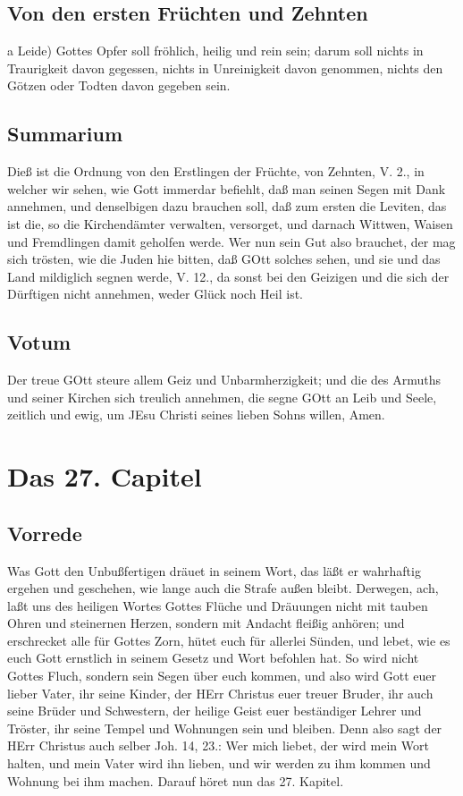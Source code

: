 \section{Von den ersten Früchten und Zehnten}

a Leide) Gottes Opfer soll fröhlich, heilig und rein sein; darum soll nichts in Traurigkeit davon gegessen, nichts in Unreinigkeit davon genommen, nichts den Götzen oder Todten davon gegeben sein.

\section{Summarium}

Dieß ist die Ordnung von den Erstlingen der Früchte, von Zehnten, V. 2., in welcher wir sehen, wie Gott immerdar befiehlt, daß man seinen Segen mit Dank annehmen, und denselbigen dazu brauchen soll, daß zum ersten die Leviten, das ist die, so die Kirchendämter verwalten, versorget, und darnach Wittwen, Waisen und Fremdlingen damit geholfen werde. Wer nun sein Gut also brauchet, der mag sich trösten, wie die Juden hie bitten, daß GOtt solches sehen, und sie und das Land mildiglich segnen werde, V. 12., da sonst bei den Geizigen und die sich der Dürftigen nicht annehmen, weder Glück noch Heil ist.

\section{Votum}

Der treue GOtt steure allem Geiz und Unbarmherzigkeit; und die des Armuths und seiner Kirchen sich treulich annehmen, die segne GOtt an Leib und Seele, zeitlich und ewig, um JEsu Christi seines lieben Sohns willen, Amen.

\chapter{Das 27. Capitel}

\section{Vorrede}

Was Gott den Unbußfertigen dräuet in seinem Wort, das läßt er wahrhaftig ergehen und geschehen, wie lange auch die Strafe außen bleibt. Derwegen, ach, laßt uns des heiligen Wortes Gottes Flüche und Dräuungen nicht mit tauben Ohren und steinernen Herzen, sondern mit Andacht fleißig anhören; und erschrecket alle für
Gottes Zorn, hütet euch für allerlei Sünden, und lebet, wie es euch Gott ernstlich in seinem Gesetz und Wort befohlen hat. So wird nicht Gottes Fluch, sondern sein Segen über euch kommen, und also wird Gott euer lieber Vater, ihr seine Kinder, der HErr Christus euer treuer Bruder, ihr auch seine Brüder und Schwestern, der heilige Geist euer beständiger Lehrer und Tröster, ihr seine Tempel und Wohnungen sein und bleiben. Denn also sagt der HErr Christus auch selber Joh. 14, 23.: Wer mich liebet, der wird mein Wort halten, und mein Vater wird ihn lieben, und wir werden zu ihm kommen und Wohnung bei ihm machen. Darauf höret nun das 27. Kapitel.

